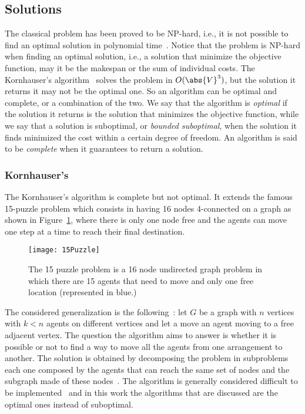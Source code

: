 \subsection{Solutions}
The classical  problem has been proved to be NP-hard, i.e., it is 
not possible to find an optimal solution in polynomial
time~\cite{lavalle}\cite{MAPFNPHARD}\cite{MAPFIntractable}. Notice that the
problem is NP-hard when finding an optimal solution, i.e., a solution that
minimize the objective function, may it be the makespan or the sum of
individual costs. The Kornhauser's algorithm~\cite{kornhauser} solves the
 problem in $O(\abs{V}^3)$, but the solution it returns it may not
be the optimal one. \newline
So an algorithm can be optimal and complete, or a combination of the two. We
say that the algorithm is \textit{optimal} if the solution it returns is the 
solution that minimizes the objective function, while we say that a solution is
suboptimal, or \textit{bounded suboptimal}, when the solution it finds 
minimized the cost within a certain degree of freedom. An algorithm is said to 
be \textit{complete} when it guarantees to return a solution.
%
\subsubsection{Kornhauser's}
The Kornhauser's algorithm is complete but not optimal. It extends the famous
15-puzzle problem which consists in having 16 nodes 4-connected on a graph as
shown in Figure~\ref{fig:15Puzzle}, where there is only one node free and the 
agents can move one step at a time to reach their final destination.
\begin{figure}[t]
  \centering
  \texttt{[image: 15Puzzle]}
  \caption{The 15 puzzle problem is a 16 node undirected graph problem in which
  there are 15 agents that need to move and only one free location
  (represented in blue.)}
  \label{fig:15Puzzle}
\end{figure}\newline
The considered generalization is the following~\cite{kornhauser}: let $G$ be a 
graph with $n$ vertices with $k<n$ agents on different vertices and let a move
an agent moving to a free adjacent vertex. The question the algorithm aims to
answer is whether it is possible or not to find a way to move all the agents
from one arrangement to another. The solution is obtained by decomposing the
problem in subproblems each one composed by the agents that can reach the same
set of nodes and the subgraph made of these nodes~\cite{pebble}. \newline 
The algorithm is generally considered difficult to be 
implemented~\cite{MAPF_overview} and in this work the algorithms that are
discussed are the optimal ones instead of suboptimal. 
%
